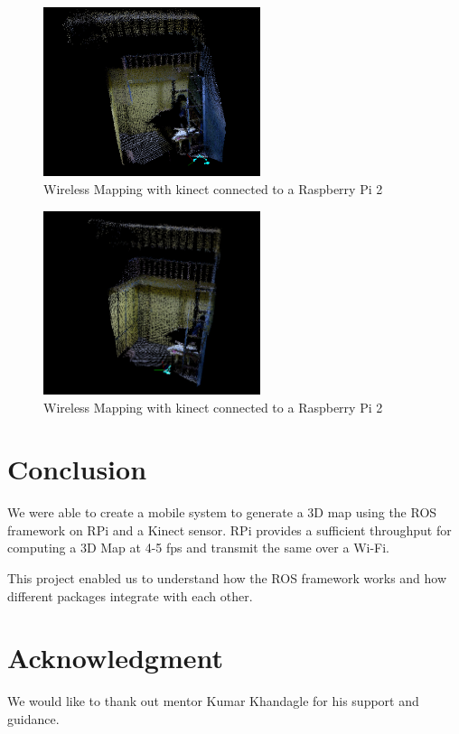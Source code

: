 \documentclass[journal]{IEEEtran}
\begin{document}
\newpage

\begin{figure}[ht]
	\centering
	\includegraphics[width=2.5in]{2(1).png}
	\caption{Wireless Mapping with kinect connected to a Raspberry Pi 2}
	\label{fig_sim}
\end{figure}

\begin{figure}[ht]
	\centering
	\includegraphics[width=2.5in]{2(2).png}
	\caption{Wireless Mapping with kinect connected to a Raspberry Pi 2}
	\label{fig_sim}
\end{figure}

\section{Conclusion}
We were able to create a mobile system to generate a 3D map using the ROS framework on RPi and a Kinect sensor.
RPi provides a sufficient throughput for computing a 3D Map at 4-5 fps and transmit the same over a Wi-Fi.

This project enabled us to understand how the ROS framework works and how different packages integrate with each other.

\section*{Acknowledgment}

We would like to thank out mentor Kumar Khandagle for his support and guidance.
\end{document}

